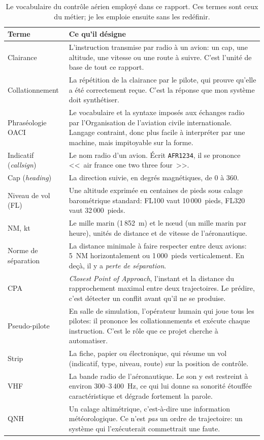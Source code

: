 \documentclass[11pt,a4paper]{article}
\begin{document}
\begin{table}[!htbp]
\centering
\caption[Le vocabulaire du contrôle aérien employé dans ce rapport]{Le vocabulaire du contrôle aérien employé dans ce rapport. Ces termes sont ceux du
métier; je les emploie ensuite sans les redéfinir.}
\label{tab:glossaire}
\small
\begin{tabular}{>{\raggedright\arraybackslash}p{3.4cm} >{\raggedright\arraybackslash}p{12.0cm}}
\toprule
\rowcolor{lightgray}\textbf{Terme} & \textbf{Ce qu'il désigne}\\
\midrule
Clairance & L'instruction transmise par radio à un avion: un cap, une altitude, une vitesse ou une route à suivre. C'est l'unité de base de tout ce rapport.\\
Collationnement & La répétition de la clairance par le pilote, qui prouve qu'elle a été correctement reçue. C'est la réponse que mon système doit synthétiser.\\
Phraséologie OACI & Le vocabulaire et la syntaxe imposés aux échanges radio par l'Organisation de l'aviation civile internationale. Langage contraint, donc plus facile à interpréter par une machine, mais impitoyable sur la forme.\\
Indicatif (\emph{callsign}) & Le nom radio d'un avion. Écrit \texttt{AFR1234}, il se prononce <<~air france one two three four~>>.\\
Cap (\emph{heading}) & La direction suivie, en degrés magnétiques, de 0 à 360.\\
Niveau de vol (FL) & Une altitude exprimée en centaines de pieds sous calage barométrique standard: FL100 vaut 10\,000~pieds, FL320 vaut 32\,000~pieds.\\
NM, kt & Le mille marin (1\,852~m) et le n\oe ud (un mille marin par heure), unités de distance et de vitesse de l'aéronautique.\\
Norme de séparation & La distance minimale à faire respecter entre deux avions: 5~NM horizontalement ou 1\,000~pieds verticalement. En deçà, il y a \emph{perte de séparation}.\\
CPA & \emph{Closest Point of Approach}, l'instant et la distance du rapprochement maximal entre deux trajectoires. Le prédire, c'est détecter un conflit avant qu'il ne se produise.\\
Pseudo-pilote & En salle de simulation, l'opérateur humain qui joue tous les pilotes: il prononce les collationnements et exécute chaque instruction. C'est le rôle que ce projet cherche à automatiser.\\
Strip & La fiche, papier ou électronique, qui résume un vol (indicatif, type, niveau, route) sur la position de contrôle.\\
VHF & La bande radio de l'aéronautique. Le son y est restreint à environ 300--3\,400~Hz, ce qui lui donne sa sonorité étouffée caractéristique et dégrade fortement la parole.\\
QNH & Un calage altimétrique, c'est-à-dire une information météorologique. Ce n'est \emph{pas} un ordre de trajectoire: un système qui l'exécuterait commettrait une faute.\\
\bottomrule
\end{tabular}
\end{table}
\end{document}
